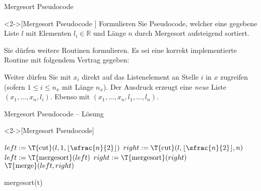 \ifull
\begin{frame}[c]{Mergesort Pseudocode}
    \begin{exercise}<2->[Mergesort Pseudocode ]
        \pause{}Formulieren Sie Pseudocode, welcher eine gegebene Liste \(l\) mit Elementen \(l_i \in \mathbb{R}\) und Länge \(n\) durch Mergesort aufsteigend sortiert.\pause{}\medskip\par
        Sie dürfen weitere Routinen formulieren. Es sei eine korrekt implementierte Routine  mit folgendem Vertrag gegeben:
\begin{algorithm}[H]
    \PreCode
    \StartCode
\end{algorithm}
        \medskip\par
        Weiter dürfen Sie mit \(x_i\) direkt auf das Listenelement an Stelle \(i\) in \(x\) zugreifen (sofern \(1 \leq i \leq n_x\) mit Länge \(n_x\)). Der Ausdruck  erzeugt eine \emph{neue} Liste \((x_1, \ldots, x_n, l_i)\). Ebenso  mit \((x_1, \ldots, x_n, l_1, \ldots, l_n)\).
    \end{exercise}
\end{frame}

\begin{frame}[c]{Mergesort Pseudocode -- Lösung}
    \begin{solve}<2->[Mergesort Pseudocode]
        \pause{}\small\begin{algorithm}[H]
        \PreCode
        \StartCode
            \(left := \text{\T{cut}}(l, 1, \lfloor\sfrac{n}{2}\rfloor)\)\;
            \(right := \text{\T{cut}}(l, \lfloor\sfrac{n}{2}\rfloor, n)\)\;
            \(left := \text{\T{mergesort}}(left)\)\;
            \(right := \text{\T{mergesort}}(right)\)\;
            \KwRet \(\text{\T{merge}}(left, right)\)
            \caption{mergesort(t)}
    \end{algorithm}
    \end{solve}
\end{frame}

